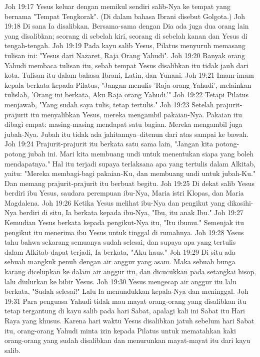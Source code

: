 Joh 19:17  Yesus keluar dengan memikul sendiri salib-Nya ke tempat yang bernama "Tempat Tengkorak". (Di dalam bahasa Ibrani disebut Golgota.)
Joh 19:18  Di sana Ia disalibkan. Bersama-sama dengan Dia ada juga dua orang lain yang disalibkan; seorang di sebelah kiri, seorang di sebelah kanan dan Yesus di tengah-tengah.
Joh 19:19  Pada kayu salib Yesus, Pilatus menyuruh memasang tulisan ini: "Yesus dari Nazaret, Raja Orang Yahudi".
Joh 19:20  Banyak orang Yahudi membaca tulisan itu, sebab tempat Yesus disalibkan itu tidak jauh dari kota. Tulisan itu dalam bahasa Ibrani, Latin, dan Yunani.
Joh 19:21  Imam-imam kepala berkata kepada Pilatus, "Jangan menulis 'Raja orang Yahudi', melainkan tulislah, 'Orang ini berkata, Aku Raja orang Yahudi.'"
Joh 19:22  Tetapi Pilatus menjawab, "Yang sudah saya tulis, tetap tertulis."
Joh 19:23  Setelah prajurit-prajurit itu menyalibkan Yesus, mereka mengambil pakaian-Nya. Pakaian itu dibagi empat: masing-masing mendapat satu bagian. Mereka mengambil juga jubah-Nya. Jubah itu tidak ada jahitannya--ditenun dari atas sampai ke bawah.
Joh 19:24  Prajurit-prajurit itu berkata satu sama lain, "Jangan kita potong-potong jubah ini. Mari kita membuang undi untuk menentukan siapa yang boleh mendapatnya." Hal itu terjadi supaya terlaksana apa yang tertulis dalam Alkitab, yaitu: "Mereka membagi-bagi pakaian-Ku, dan membuang undi untuk jubah-Ku." Dan memang prajurit-prajurit itu berbuat begitu.
Joh 19:25  Di dekat salib Yesus berdiri ibu Yesus, saudara perempuan ibu-Nya, Maria istri Klopas, dan Maria Magdalena.
Joh 19:26  Ketika Yesus melihat ibu-Nya dan pengikut yang dikasihi-Nya berdiri di situ, Ia berkata kepada ibu-Nya, "Ibu, itu anak Ibu."
Joh 19:27  Kemudian Yesus berkata kepada pengikut-Nya itu, "Itu ibumu." Semenjak itu pengikut itu menerima ibu Yesus untuk tinggal di rumahnya.
Joh 19:28  Yesus tahu bahwa sekarang semuanya sudah selesai, dan supaya apa yang tertulis dalam Alkitab dapat terjadi, Ia berkata, "Aku haus."
Joh 19:29  Di situ ada sebuah mangkuk penuh dengan air anggur yang asam. Maka sebuah bunga karang dicelupkan ke dalam air anggur itu, dan dicucukkan pada setangkai hisop, lalu diulurkan ke bibir Yesus.
Joh 19:30  Yesus mengecap air anggur itu lalu berkata, "Sudah selesai!" Lalu Ia menundukkan kepala-Nya dan meninggal.
Joh 19:31  Para penguasa Yahudi tidak mau mayat orang-orang yang disalibkan itu tetap tergantung di kayu salib pada hari Sabat, apalagi kali ini Sabat itu Hari Raya yang khusus. Karena hari waktu Yesus disalibkan jatuh sebelum hari Sabat itu, orang-orang Yahudi minta izin kepada Pilatus untuk mematahkan kaki orang-orang yang sudah disalibkan dan menurunkan mayat-mayat itu dari kayu salib.

